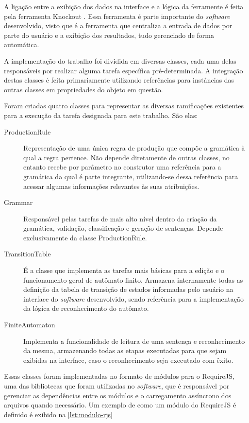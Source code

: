 \documentclass[12pt]{article}
\begin{document}
A ligação entre a exibição dos dados na interface e a lógica da ferramente é feita pela ferramenta Knockout
\cite{knockout}. Essa ferramenta é parte importante do \textit{software} desenvolvido, visto que é a ferramenta que
centraliza a entrada de dados por parte do usuário e a exibição dos resultados, tudo gerenciado de forma automática.

A implementação do trabalho foi dividida em diversas classes, cada uma delas responsáveis por realizar alguma tarefa
específica pré-determinada. A integração destas classes é feita primariamente utilizando referências para instâncias
das outras classes em propriedades do objeto em questão.

Foram criadas quatro classes para representar as diversas ramificações existentes para a execução da tarefa designada
para este trabalho. São elas:

\begin{description}
  \item[ProductionRule]
  Representação de uma única regra de produção que compõe a gramática à qual a regra pertence. Não depende diretamente
  de outras classes, no entanto recebe por parâmetro no construtor uma referência para a gramática da qual é parte
  integrante, utilizando-se dessa referência para acessar algumas informações relevantes às suas atribuições.

  \item[Grammar]
  Responsável pelas tarefas de mais alto nível dentro da criação da gramática, validação, classificação e geração de
  sentenças. Depende exclusivamente da classe ProductionRule.

  \item[TransitionTable]
  É a classe que implementa as tarefas mais básicas para a edição e o funcionamento geral de autômato finito. Armazena
  internamente todas as definição da tabela de transição de estados informadas pelo usuário na interface do
  \textit{software} desenvolvido, sendo referência para a implementação da lógica de reconhecimento do autômato.

  \item[FiniteAutomaton]
  Implementa a funcionalidade de leitura de uma sentença e reconhecimento da mesma, armazenando todas as etapas executadas
  para que sejam exibidas na interface, caso o reconhecimento seja executado com êxito.
\end{description}

Essas classes foram implementadas no formato de módulos para o RequireJS, uma das bibliotecas que foram utilizadas no
\textit{software}, que é responsável por gerenciar as dependências entre os módulos e o carregamento assíncrono dos
arquivos quando necessário. Um exemplo de como um módulo do RequireJS é definido é exibido na \autoref{lst:modulo-rjs}
\end{document}
